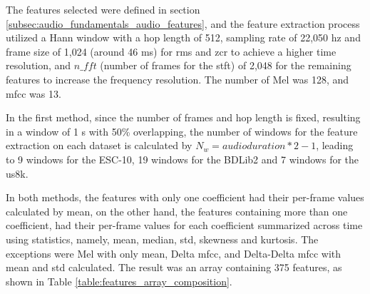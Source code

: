 The features selected were defined in section \ref{subsec:audio_fundamentals_audio_features}, and the feature extraction process utilized a Hann window \cite{Blackmann1958} with a hop length of 512, sampling rate of 22,050 \gls{hz} and frame size of 1,024 (around 46 ms) for \gls{rms} and \gls{zcr} to achieve a higher time resolution, and $n\_fft$ (number of frames for the \gls{stft}) of 2,048 for the remaining features to increase the frequency resolution. The number of Mel was 128, and \gls{mfcc} was 13.

In the first method, since the number of frames and hop length is fixed, resulting in a window of 1 \gls{s} with 50\% overlapping, the number of windows for the feature extraction on each dataset is calculated by $N_w = audioduration * 2 -1$, leading to 9 windows for the ESC-10, 19 windows for the BDLib2 and 7 windows for the \gls{us8k}.

In both methods, the features with only one coefficient had their per-frame values calculated by mean, on the other hand, the features containing more than one coefficient, had their per-frame values for each coefficient summarized across time using statistics, namely, mean, median, \gls{std}, skewness and kurtosis. The exceptions were Mel with only mean, Delta \gls{mfcc}, and Delta-Delta \gls{mfcc} with mean and \gls{std} calculated.  The result was an array containing 375 features, as shown in Table \ref{table:features_array_composition}.

